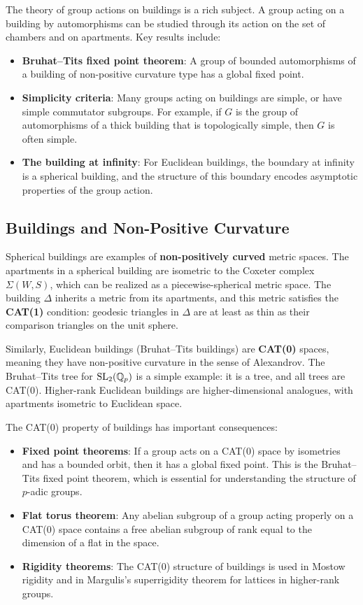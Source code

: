 The theory of group actions on buildings is a rich subject. A group acting on a building by automorphisms can be studied through its action on the set of chambers and on apartments. Key results include:
\begin{itemize}
    \item \textbf{Bruhat--Tits fixed point theorem}: A group of bounded automorphisms of a building of non-positive curvature type has a global fixed point.
    \item \textbf{Simplicity criteria}: Many groups acting on buildings are simple, or have simple commutator subgroups. For example, if \(G\) is the group of automorphisms of a thick building that is topologically simple, then \(G\) is often simple.
    \item \textbf{The building at infinity}: For Euclidean buildings, the boundary at infinity is a spherical building, and the structure of this boundary encodes asymptotic properties of the group action.
\end{itemize}

\subsection{Buildings and Non-Positive Curvature}

Spherical buildings are examples of \textbf{non-positively curved} metric spaces. The apartments in a spherical building are isometric to the Coxeter complex \(\Sigma(W, S)\), which can be realized as a piecewise-spherical metric space. The building \(\Delta\) inherits a metric from its apartments, and this metric satisfies the \textbf{CAT(1)} condition: geodesic triangles in \(\Delta\) are at least as thin as their comparison triangles on the unit sphere.

Similarly, Euclidean buildings (Bruhat--Tits buildings) are \textbf{CAT(0)} spaces, meaning they have non-positive curvature in the sense of Alexandrov. The Bruhat--Tits tree for \(\operatorname{SL}_2(\mathbb{Q}_p)\) is a simple example: it is a tree, and all trees are CAT(0). Higher-rank Euclidean buildings are higher-dimensional analogues, with apartments isometric to Euclidean space.

The CAT(0) property of buildings has important consequences:
\begin{itemize}
    \item \textbf{Fixed point theorems}: If a group acts on a CAT(0) space by isometries and has a bounded orbit, then it has a global fixed point. This is the Bruhat--Tits fixed point theorem, which is essential for understanding the structure of \(p\)-adic groups.
    \item \textbf{Flat torus theorem}: Any abelian subgroup of a group acting properly on a CAT(0) space contains a free abelian subgroup of rank equal to the dimension of a flat in the space.
    \item \textbf{Rigidity theorems}: The CAT(0) structure of buildings is used in Mostow rigidity and in Margulis's superrigidity theorem for lattices in higher-rank groups.
\end{itemize}

